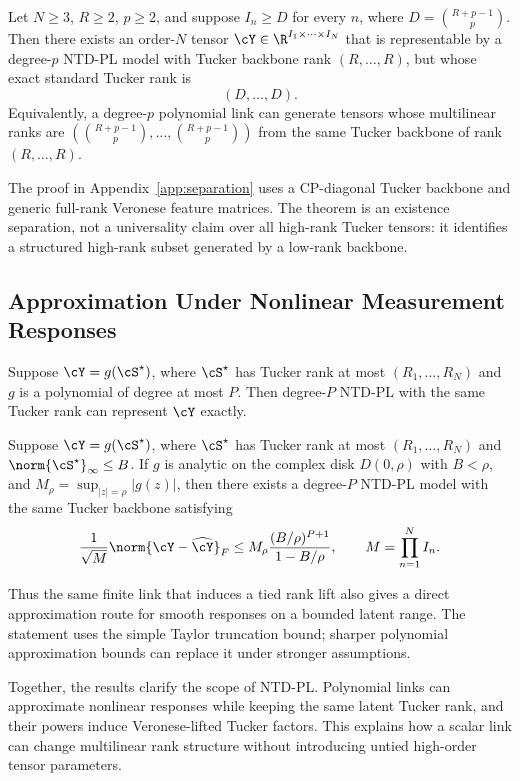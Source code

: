 \begin{theorem}
\label{thm:tucker-separation}
Let \(N\ge 3\), \(R\ge 2\), \(p\ge 2\), and suppose \(I_n\ge D\) for every
\(n\), where \(D=\binom{R+p-1}{p}\). Then there exists an order-\(N\) tensor
\(\cY\in\R^{I_1\times\cdots\times I_N}\) that is representable by a
degree-\(p\) NTD-PL model with Tucker backbone rank \((R,\ldots,R)\), but
whose exact standard Tucker rank is
\begin{equation}
  (D,\ldots,D).
\end{equation}
Equivalently, a degree-\(p\) polynomial link can generate tensors whose
multilinear ranks are
\((\binom{R+p-1}{p},\ldots,\binom{R+p-1}{p})\) from the same Tucker backbone
of rank \((R,\ldots,R)\).
\end{theorem}

The proof in Appendix~\ref{app:separation} uses a CP-diagonal Tucker backbone and
generic full-rank Veronese feature matrices. The theorem is an existence
separation, not a universality claim over all high-rank Tucker tensors: it
identifies a structured high-rank subset generated by a low-rank
backbone.

\subsection{Approximation Under Nonlinear Measurement Responses}

\begin{theorem}
\label{thm:poly-generation}
Suppose \(\cY = g(\cS^\star)\), where \(\cS^\star\) has Tucker rank at most
\((R_1,\ldots,R_N)\) and \(g\) is a polynomial of degree at most \(P\). Then
degree-\(P\) NTD-PL with the same Tucker rank can represent \(\cY\) exactly.
\end{theorem}

\begin{theorem}
\label{thm:analytic-approx}
Suppose \(\cY=g(\cS^\star)\), where \(\cS^\star\) has Tucker rank at most
\((R_1,\ldots,R_N)\) and \(\norm{\cS^\star}_\infty\le B\). If \(g\) is
analytic on the complex disk \(D(0,\rho)\) with \(B<\rho\), and
\(M_\rho=\sup_{|z|=\rho}|g(z)|\), then there exists a degree-\(P\) NTD-PL
model with the same Tucker backbone satisfying
\begin{equation}
  \frac{1}{\sqrt{M}}\norm{\cY-\widehat{\cY}}_F
  \le
  M_\rho
  \frac{(B/\rho)^{P+1}}{1-B/\rho},
  \qquad
  M=\prod_{n=1}^{N} I_n.
\end{equation}
\end{theorem}

Thus the same finite link that induces a tied rank lift also gives a direct
approximation route for smooth responses on a bounded latent range.
The statement uses the simple Taylor truncation bound; sharper polynomial
approximation bounds can replace it under stronger assumptions.

Together, the results clarify the scope of NTD-PL. Polynomial links can
approximate nonlinear responses while keeping the same latent
Tucker rank, and their powers induce Veronese-lifted Tucker factors. This
explains how a scalar link can change multilinear rank structure without
introducing untied high-order tensor parameters.
